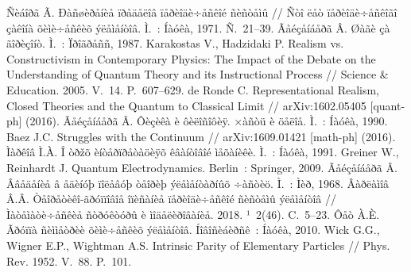 \begin{thebibliography}{99}
 Ñèáîðã Ã. Ðàñøèðåíèå ïðåäåëîâ ïåðèîäè÷åñêîé ñèñòåìû // Ñòî ëåò ïåðèîäè÷åñêîãî çàêîíà õèìè÷åñêèõ ýëåìåíòîâ. Ì.~: Íàóêà, 1971. Ñ.~21--39.
%
 Ãåéçåíáåðã Â. Øàãè çà ãîðèçîíò. Ì.~: Ïðîãðåññ, 1987.
%
 Karakostas V., Hadzidaki P. Realism vs. Constructivism in Contemporary Physics: The Impact of the Debate on the Understanding of Quantum Theory and its Instructional Process // Science \& Education. 2005. V.~14. P.~607--629.
%
 de Ronde C. Representational Realism, Closed Theories and the Quantum to Classical Limit // arXiv:1602.05405 [quant-ph] (2016).
%
 Ãåéçåíáåðã Â. Ôèçèêà è ôèëîñîôèÿ. ×àñòü è öåëîå. Ì.~: Íàóêà, 1990.
%
 Baez J.C. Struggles with the Continuum // arXiv:1609.01421 [math-ph] (2016).
%
 Ìàðêîâ Ì.À. Î òðžõ èíòåðïðåòàöèÿõ êâàíòîâîé ìåõàíèêè. Ì.~: Íàóêà, 1991.
%
 Greiner W., Reinhardt J. Quantum Electrodynamics. Berlin~: Springer, 2009.
%
 Ãåéçåíáåðã Â. Ââåäåíèå â åäèíóþ ïîëåâóþ òåîðèþ ýëåìåíòàðíûõ ÷àñòèö. Ì.~: Ìèð, 1968.
%
  Âàðëàìîâ Â.Â. Òåîðåòèêî-ãðóïïîâîå îïèñàíèå ïåðèîäè÷åñêîé ñèñòåìû ýëåìåíòîâ //
Ìàòåìàòè÷åñêèå ñòðóêòóðû è ìîäåëèðîâàíèå. 2018. ¹~2(46). C.~5--23.
%
 Ôåò À.È. Ãðóïïà ñèììåòðèè õèìè÷åñêèõ ýëåìåíòîâ. Íîâîñèáèðñê~: Íàóêà, 2010.
%
 Wick G.G., Wigner E.P., Wightman A.S. Intrinsic Parity of Elementary Particles // Phys. Rev. 1952. V.~88. P.~101.

\end{thebibliography}
\maketitleEng  %
